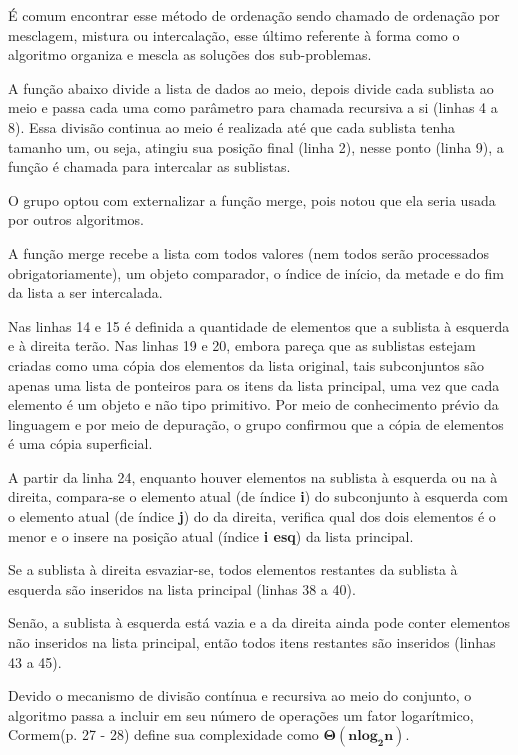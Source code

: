 \documentclass[a4paper,12pt]{scrartcl}
\begin{document}
É comum encontrar esse método de ordenação sendo chamado de ordenação por mesclagem, mistura ou intercalação, esse último referente à forma como o algoritmo organiza e mescla as soluções dos sub-problemas.

A função  abaixo divide a lista de dados ao meio, depois divide cada sublista ao meio e passa cada uma como parâmetro para chamada recursiva a si (linhas 4 a 8). Essa divisão continua ao meio é realizada até que cada sublista tenha tamanho um, ou seja, atingiu sua posição final (linha 2), nesse ponto (linha 9), a função  é chamada para intercalar as sublistas.

O grupo optou com externalizar a função merge, pois notou que ela seria usada por outros algoritmos.

A função merge recebe a lista com todos valores (nem todos serão processados obrigatoriamente), um objeto comparador, o índice de início, da metade e do fim da lista a ser intercalada.

Nas linhas 14 e 15 é definida a quantidade de elementos que a sublista à esquerda e à direita terão. Nas linhas 19 e 20, embora pareça que as sublistas estejam criadas como uma cópia dos elementos da lista original, tais subconjuntos são apenas uma lista de ponteiros para os itens da lista principal, uma vez que cada elemento é um objeto e não tipo primitivo. Por meio de conhecimento prévio da linguagem e por meio de depuração, o grupo confirmou que a cópia de elementos é uma cópia superficial.

A partir da linha 24, enquanto houver elementos na sublista à esquerda ou na à direita, compara-se o elemento atual (de índice \textbf{i}) do subconjunto à esquerda com o elemento atual (de índice \textbf{j}) do da direita, verifica qual dos dois elementos é o menor e o insere na posição atual (índice \textbf{i esq}) da lista principal.

Se a sublista à direita esvaziar-se, todos elementos restantes da sublista à esquerda são inseridos na lista principal (linhas 38 a 40).

Senão, a sublista à esquerda está vazia e a da direita ainda pode conter elementos não inseridos na lista principal, então todos itens restantes são inseridos (linhas 43 a 45).

Devido o mecanismo de divisão contínua e recursiva ao meio do conjunto, o algoritmo passa a incluir em seu número de operações um fator logarítmico, Cormem(p. 27 - 28) define sua complexidade como $\pmb{\Theta(n log_2 n)}$.
\end{document}
